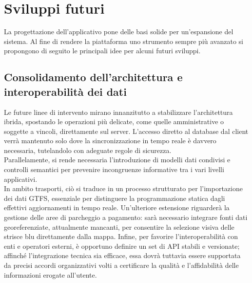 \section{Sviluppi futuri}
La progettazione dell'applicativo pone delle basi solide per un'espansione del sistema. Al fine di rendere la piattaforma uno strumento sempre più avanzato si propongono di seguito le principali idee per alcuni futuri sviluppi.
\subsection*{Consolidamento dell'architettura e interoperabilità dei dati}
Le future linee di intervento mirano innanzitutto a stabilizzare l'architettura ibrida, spostando le operazioni più delicate, come quelle amministrative o soggette a vincoli, direttamente sul server. L'accesso diretto al database dal client verrà mantenuto solo dove la sincronizzazione in tempo reale è davvero necessaria, tutelandolo con adeguate regole di sicurezza.
\\
Parallelamente, si rende necessaria l'introduzione di modelli dati condivisi e controlli semantici per prevenire incongruenze informative tra i vari livelli applicativi. 
\\
In ambito trasporti, ciò si traduce in un processo strutturato per l'importazione dei dati GTFS, essenziale per distinguere la programmazione statica dagli effettivi aggiornamenti in tempo reale. Un'ulteriore estensione riguarderà la gestione delle aree di parcheggio a pagamento: sarà necessario integrare fonti dati georeferenziate, attualmente mancanti, per consentire la selezione visiva delle strisce blu direttamente dalla mappa. Infine, per favorire l'interoperabilità con enti e operatori esterni, è opportuno definire un set di API stabili e versionate; affinché l'integrazione tecnica sia efficace, essa dovrà tuttavia essere supportata da precisi accordi organizzativi volti a certificare la qualità e l'affidabilità delle informazioni erogate all'utente.
\\
